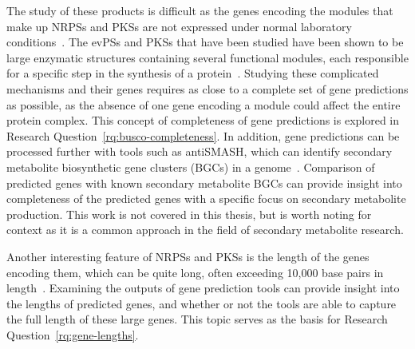  The study of these products is difficult as the genes encoding the modules that make up NRPSs and PKSs are not expressed under normal laboratory conditions~\cite{Mukherjee2012}. The evPSs and PKSs that have been studied
 have been shown to be large enzymatic structures containing several 
 functional modules, each responsible for a specific step in the synthesis 
 of a protein~\cite{Mukherjee2012}. Studying these complicated mechanisms and their genes requires as close to a complete set of gene predictions as possible, as the absence of one gene encoding a module could affect the entire protein complex. This concept of completeness of gene predictions is explored in Research Question~\ref{rq:busco-completeness}. 
 In addition, gene predictions can be processed further with tools such as antiSMASH, which can identify secondary metabolite biosynthetic gene clusters (BGCs) in a genome~\cite{blin2023}. Comparison of predicted genes with known secondary metabolite BGCs can provide insight into completeness of the predicted genes with a specific focus on secondary metabolite production. This work is not covered in this thesis, but is worth noting for context as it is a common approach in the field of secondary metabolite research.

 Another interesting feature of NRPSs and PKSs is the length of the genes encoding them, which can be quite long, often exceeding 10,000 base pairs in length~\cite{komaki2020}. Examining the outputs of gene prediction tools can provide insight into the lengths of predicted genes, and whether or not the tools are able to capture the full length of these large genes. This topic serves as the basis for Research Question~\ref{rq:gene-lengths}.  


